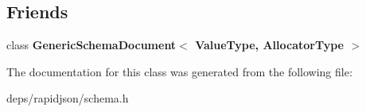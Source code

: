 \subsection*{Friends}
\begin{DoxyCompactItemize}
\item 
class {\bfseries Generic\+Schema\+Document$<$ Value\+Type, Allocator\+Type $>$}\hypertarget{classinternal_1_1_schema_a04f1d1acd0a5a7fda069c115970d52b3}{}\label{classinternal_1_1_schema_a04f1d1acd0a5a7fda069c115970d52b3}

\end{DoxyCompactItemize}


The documentation for this class was generated from the following file\+:\begin{DoxyCompactItemize}
\item 
deps/rapidjson/schema.\+h\end{DoxyCompactItemize}
